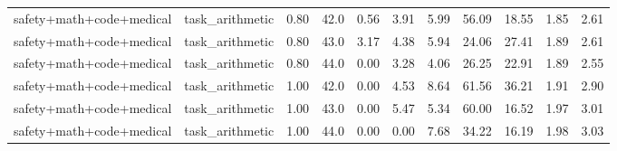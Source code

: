 \documentclass{article}
\begin{document}
\begin{table}[H]
{\begin{tabular}{llllrrrrrrr}
safety+math+code+medical & task\_arithmetic & 0.80 & 42.0 & 0.56 & 3.91 & 5.99 & 56.09 & 18.55 & 1.85 & 2.61 \\
safety+math+code+medical & task\_arithmetic & 0.80 & 43.0 & 3.17 & 4.38 & 5.94 & 24.06 & 27.41 & 1.89 & 2.61 \\
safety+math+code+medical & task\_arithmetic & 0.80 & 44.0 & 0.00 & 3.28 & 4.06 & 26.25 & 22.91 & 1.89 & 2.55 \\
safety+math+code+medical & task\_arithmetic & 1.00 & 42.0 & 0.00 & 4.53 & 8.64 & 61.56 & 36.21 & 1.91 & 2.90 \\
safety+math+code+medical & task\_arithmetic & 1.00 & 43.0 & 0.00 & 5.47 & 5.34 & 60.00 & 16.52 & 1.97 & 3.01 \\
safety+math+code+medical & task\_arithmetic & 1.00 & 44.0 & 0.00 & 0.00 & 7.68 & 34.22 & 16.19 & 1.98 & 3.03 \\
\bottomrule
\end{tabular}
}
\end{table}


\begin{table}[H]
\centering
\caption{Alpha スイープ 集計 - Method: safemerge, Pattern: safety+math}
\label{tab:sweep_safemerge_safety_math}
\small
{}
\end{table}
\end{document}
